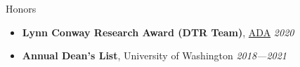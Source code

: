 \documentclass{resume}
\begin{document}
	\begin{rSection}{Honors}
		\begin{itemize}
			\setlength{\itemsep}{1pt}
			\setlength{\parskip}{0pt}
			\setlength{\parsep}{0pt}
			\item \textbf{Lynn Conway Research Award (DTR Team)}, \href{https://adacenter.org}{ADA} \hfill {\em 2020}
			\item \textbf{Annual Dean's List}, University of Washington \hfill {\em 2018---2021}
		\end{itemize}
	\end{rSection}
\end{document}
